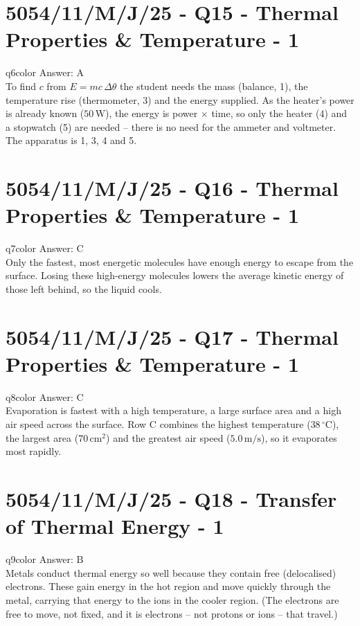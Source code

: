 \documentclass[11pt,a4paper]{article}
\newcommand{\examq}[4]{\section[#1 - Q#2]{#1 - Q#2 - #3 - #4}}
\begin{document}
\examq{5054/11/M/J/25}{15}{Thermal Properties \& Temperature}{1}

\begin{ansbox}{q6color}
Answer: $\boxed{\text{A}}$\\[4pt]
To find $c$ from $E = mc\,\Delta\theta$ the student needs the mass (balance, 1), the temperature rise (thermometer, 3) and the energy supplied. As the heater's power is already known ($50\,\mathrm{W}$), the energy is power $\times$ time, so only the heater (4) and a stopwatch (5) are needed -- there is no need for the ammeter and voltmeter. The apparatus is 1, 3, 4 and 5.
\end{ansbox}

\examq{5054/11/M/J/25}{16}{Thermal Properties \& Temperature}{1}

\begin{ansbox}{q7color}
Answer: $\boxed{\text{C}}$\\[4pt]
Only the fastest, most energetic molecules have enough energy to escape from the surface. Losing these high-energy molecules lowers the average kinetic energy of those left behind, so the liquid cools.
\end{ansbox}

\examq{5054/11/M/J/25}{17}{Thermal Properties \& Temperature}{1}

\begin{ansbox}{q8color}
Answer: $\boxed{\text{C}}$\\[4pt]
Evaporation is fastest with a high temperature, a large surface area and a high air speed across the surface. Row C combines the highest temperature ($38\,^{\circ}$C), the largest area ($70\,\mathrm{cm^2}$) and the greatest air speed ($5.0\,\mathrm{m/s}$), so it evaporates most rapidly.
\end{ansbox}

\examq{5054/11/M/J/25}{18}{Transfer of Thermal Energy}{1}

\begin{ansbox}{q9color}
Answer: $\boxed{\text{B}}$\\[4pt]
Metals conduct thermal energy so well because they contain free (delocalised) electrons. These gain energy in the hot region and move quickly through the metal, carrying that energy to the ions in the cooler region. (The electrons are free to move, not fixed, and it is electrons -- not protons or ions -- that travel.)
\end{ansbox}
\end{document}
